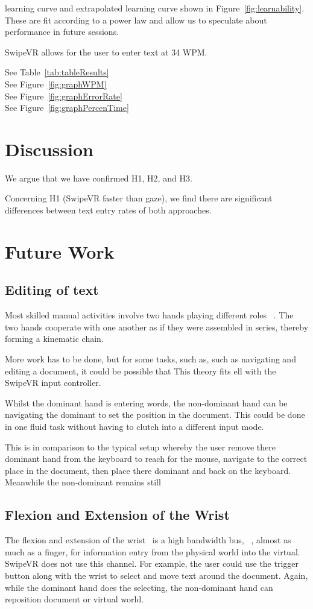 \documentclass{sigchi}
\begin{document}
learning curve and extrapolated learning curve shown in Figure~\ref{fig:learnability}.
These are fit according to a power law and allow us to speculate about performance in future sessions.

SwipeVR allows for the user to enter text at 34 WPM.

See Table~\ref{tab:tableResults}\\
See Figure~\ref{fig:graphWPM}\\
See Figure~\ref{fig:graphErrorRate}\\
See Figure~\ref{fig:graphPercenTime}\\

\section{Discussion}
We argue that we have confirmed H1, H2, and H3.

Concerning H1 (SwipeVR faster than gaze), we find there are significant differences between text entry rates of both approaches.

\section{Future Work}
\subsection{Editing of text}
Most skilled manual activities involve two hands playing different roles ~\cite{guiard1987asymmetric, Casalta:1999:ETI:632716.632862}.
The two hands cooperate with one another as if they were assembled in series, thereby forming a kinematic chain.

More work has to be done, but for some tasks, such as, such as navigating and editing a document, it could be possible that This theory fits ell with the SwipeVR input controller.

Whilst the dominant hand is entering words, the non-dominant hand can be navigating the dominant to set the position in the document.
This could be done in one fluid task without having to clutch into a different input mode.

This is in  comparison to the typical setup whereby the user remove there dominant hand from the keyboard to reach for the mouse, navigate to the correct place in the document, then place there dominant and back on the keyboard. 
Meanwhile the non-dominant remains still

\subsection{Flexion and Extension of the Wrist}
The flexion and extension of the wrist~\cite{sarrafian1977study} is a high bandwidth bus, ~\cite{TBD}, almost as much as a finger, for information entry from the physical world into the virtual.
SwipeVR does not use this channel.
For example, the user could use the trigger button along with the wrist to select and move text around the document.
Again, while the dominant hand does the selecting, the non-dominant hand can reposition document or virtual world.
\end{document}
